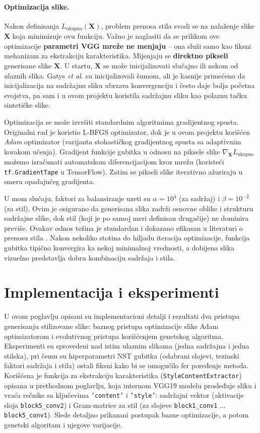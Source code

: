 \documentclass[a4paper,12pt]{article}
\begin{document}
\paragraph{Optimizacija slike.} Nakon definisanja $L_{\text{ukupno}}(\mathbf{X})$, problem prenosa stila svodi se na nalaženje slike $\mathbf{X}$ koja minimizuje ovu funkciju. Važno je naglasiti da se prilikom ove optimizacije \textbf{parametri VGG mreže ne menjaju} -- ona služi samo kao fiksni mehanizam za ekstrakciju karakteristika. Mijenjaju se \textbf{direktno pikseli} generisane slike $\mathbf{X}$. U startu, $\mathbf{X}$ se može inicijalizovati slučajno ili nekom od ulaznih slika. Gatys \emph{et al.} su inicijalizovali šumom, ali je kasnije primećeno da inicijalizacija na sadržajnu sliku ubrzava konvergenciju i često daje bolja početna svojstva, pa sam i u ovom projektu koristila sadržajnu sliku kao polaznu tačku sintetičke slike.

Optimizacija se može izvršiti standardnim algoritmima gradijentnog spusta. Originalni rad je koristio L-BFGS optimizator, dok je u ovom projektu korišćen \emph{Adam} optimizator (varijanta stohastičkog gradijentnog spusta sa adaptivnim korakom učenja). Gradijent funkcije gubitka u odnosu na piksele slike $\nabla_{\mathbf{X}} L_{\text{ukupno}}$ možemo izračunati automatskom diferencijacijom kroz mrežu (koristeći \texttt{tf.GradientTape} u TensorFlow). Zatim se pikseli slike iterativno ažuriraju u smeru opadajućeg gradijenta.

U mom slučaju, faktori za balansiranje uzeti su $\alpha = 10^{4}$ (za sadržaj) i $\beta = 10^{-2}$ (za stil). 
Ovim je osigurano da generisana slika zadrži osnovne oblike i strukturu sadržajne slike, dok stil 
(koji je po samoj meri definisan drugačije) ne dominira previše. 
Ovakav odnos težina je standardan i dokazano efikasan u literaturi o prenosu stila . 
Nakon nekoliko stotina do hiljadu iteracija optimizacije, funkcija gubitka tipično konvergira ka nekoj minimalnoj vrednosti, 
a dobijena slika vizuelno predstavlja dobru kombinaciju sadržaja i stila.

\newpage
\section{Implementacija i eksperimenti}
U ovom poglavlju opisani su implementacioni detalji i rezultati dva pristupa generisanju stilizovane slike: baznog pristupa optimizacije slike Adam optimizatorom i evolutivnog pristupa korišćenjem genetskog algoritma. Eksperimenti su sprovedeni nad istim ulaznim slikama (jedna sadržajna i jedna stilska), pri čemu su hiperparametri NST gubitka (odabrani slojevi, tezinski faktori sadržaja i stila) ostali fiksni kako bi se omogućilo fer poređenje metoda. Korišćena je funkcija za ekstrakciju karakteristika (\texttt{StyleContentExtractor}) opisana u prethodnom poglavlju, koja internom VGG19 modelu prosleđuje sliku i vraća rečnike sa ključevima \texttt{'content'} i \texttt{'style'}: sadržajni vektor (aktivacije sloja \texttt{block5\_conv2}) i Gram-matrice za stil (za slojeve \texttt{block1\_conv1} ... \texttt{block5\_conv1}). Slede detaljno prikazani postupak bazne optimizacije, a potom genetski algoritam i njegove varijacije.
\end{document}

